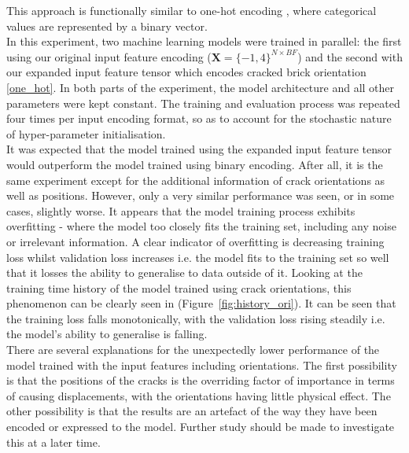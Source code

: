 \noindent This approach is functionally similar to one-hot encoding \cite{seger2018investigation}, where categorical values are represented by a binary vector. \\

\noindent
In this experiment, two machine learning models were trained in parallel: the first using our original input feature encoding ($\textbf{X} = \{-1, 4\}^{N \times BF}$) and the second with our expanded input feature tensor which encodes cracked brick orientation \ref{one_hot}. In both parts of the experiment, the model architecture and all other parameters were kept constant.  The training and evaluation process was repeated four times per input encoding format, so as to account for the stochastic nature of hyper-parameter initialisation.
\\

\noindent It was expected that the model trained using the expanded input feature tensor would outperform  the model trained using binary encoding.  After all, it is the same experiment except for the additional information of crack orientations as well as positions. However, only a very similar performance was seen, or in some cases, slightly worse. It appears that the model training process exhibits overfitting - where the model too closely fits the training set, including any noise or irrelevant information.  A clear indicator of overfitting is decreasing training loss whilst validation loss increases i.e. the model fits to the training set so well that it losses the ability to generalise to data outside of it. Looking at the training time history of the model trained using crack orientations, this phenomenon can be clearly seen in (Figure~\ref{fig:history_ori}). It can be seen that the training loss falls monotonically, with the validation loss rising steadily i.e. the model's ability to generalise is falling. \\

\noindent There are several explanations for the unexpectedly lower performance of the model trained with the input features including orientations. The first possibility is that the positions of the cracks is the overriding factor of importance in terms of causing displacements, with the orientations having little physical effect. The other possibility is that the results are an artefact of the way they have been encoded or expressed to the model. Further study should be made to investigate this at a later time.

